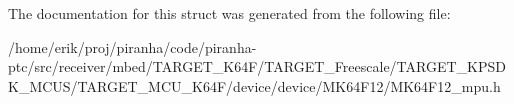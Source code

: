 The documentation for this struct was generated from the following file\+:\begin{DoxyCompactItemize}
\item 
/home/erik/proj/piranha/code/piranha-\/ptc/src/receiver/mbed/\+T\+A\+R\+G\+E\+T\+\_\+\+K64\+F/\+T\+A\+R\+G\+E\+T\+\_\+\+Freescale/\+T\+A\+R\+G\+E\+T\+\_\+\+K\+P\+S\+D\+K\+\_\+\+M\+C\+U\+S/\+T\+A\+R\+G\+E\+T\+\_\+\+M\+C\+U\+\_\+\+K64\+F/device/device/\+M\+K64\+F12/M\+K64\+F12\+\_\+mpu.\+h\end{DoxyCompactItemize}
